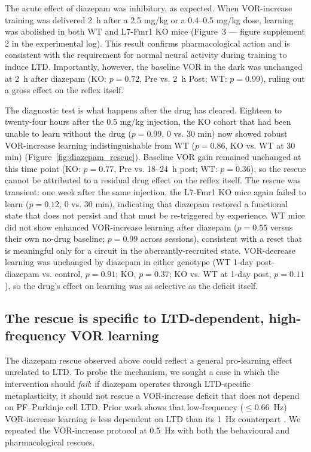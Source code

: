 \documentclass[11pt]{article}
\begin{document}
The acute effect of diazepam was inhibitory, as expected. When VOR-increase
training was delivered 2~h after a 2.5 mg/kg or a 0.4--0.5 mg/kg dose,
learning was abolished in both WT and L7-Fmr1 KO mice (Figure~3 --- figure
supplement 2 in the experimental log). This result confirms pharmacological
action and is consistent with the requirement for normal neural activity
during training to induce LTD. Importantly, however, the baseline VOR in
the dark was unchanged at 2~h after diazepam (KO: $p = 0.72$, Pre vs. 2~h
Post; WT: $p = 0.99$), ruling out a gross effect on the reflex itself.

The diagnostic test is what happens after the drug has cleared. Eighteen
to twenty-four hours after the 0.5 mg/kg injection, the KO cohort that
had been unable to learn without the drug ($p = 0.99$, 0 vs. 30 min)
now showed robust VOR-increase learning indistinguishable from WT
($p = 0.86$, KO vs. WT at 30 min) (Figure~\ref{fig:diazepam_rescue}).
Baseline VOR gain remained unchanged at this time point (KO: $p = 0.77$,
Pre vs. 18--24~h post; WT: $p = 0.36$), so the rescue cannot be attributed
to a residual drug effect on the reflex itself. The rescue was transient:
one week after the same injection, the L7-Fmr1 KO mice again failed to
learn ($p = 0.12$, 0 vs. 30 min), indicating that diazepam restored a
functional state that does not persist and that must be re-triggered by
experience. WT mice did not show enhanced VOR-increase learning after
diazepam ($p = 0.55$ versus their own no-drug baseline; $p = 0.99$ across
sessions), consistent with a reset that is meaningful only for a circuit
in the aberrantly-recruited state. VOR-decrease learning was unchanged
by diazepam in either genotype (WT 1-day post-diazepam vs. control,
$p = 0.91$; KO, $p = 0.37$; KO vs. WT at 1-day post, $p = 0.11$), so the
drug's effect on learning was as selective as the deficit itself.

\subsection{The rescue is specific to LTD-dependent, high-frequency VOR
learning}

The diazepam rescue observed above could reflect a general pro-learning
effect unrelated to LTD. To probe the mechanism, we sought a case in which
the intervention should \emph{fail}: if diazepam operates through
LTD-specific metaplasticity, it should not rescue a VOR-increase deficit
that does not depend on PF--Purkinje cell LTD. Prior work shows that low-frequency ($\leq 0.66$~Hz)
VOR-increase learning is less dependent on LTD than its 1~Hz counterpart
\citep{boyden2004cerebellum}. We repeated the VOR-increase protocol at
0.5~Hz with both the behavioural and pharmacological rescues.
\end{document}
